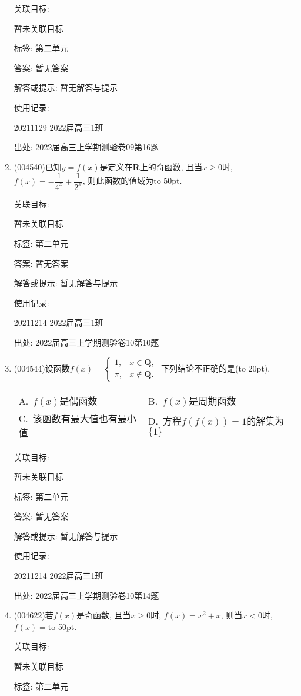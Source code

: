 \documentclass[10pt,a4paper]{article}
\newcommand{\blank}[1]{\underline{\hbox to #1pt{}}}
\newcommand{\bracket}[1]{(\hbox to #1pt{})}
\newcommand{\twoch}[4]{\par\begin{tabular}{p{.46\textwidth}p{.46\textwidth}}
A.~#1& B.~#2\\
C.~#3& D.~#4
\end{tabular}}
\begin{document}
\begin{enumerate}[1.]
关联目标:

暂未关联目标



标签: 第二单元

答案: 暂无答案

解答或提示: 暂无解答与提示

使用记录:

20211129	2022届高三1班	


出处: 2022届高三上学期测验卷09第16题
\item { (004540)}已知$y=f(x)$是定义在$\mathbf{R}$上的奇函数, 且当$x\ge 0$时, $f(x)=-\dfrac 1{4^x}+\dfrac 1{2^x}$, 则此函数的值域为\blank{50}.


关联目标:

暂未关联目标



标签: 第二单元

答案: 暂无答案

解答或提示: 暂无解答与提示

使用记录:

20211214	2022届高三1班	


出处: 2022届高三上学期测验卷10第10题
\item { (004544)}设函数$f(x)=\begin{cases}1, & x\in \mathbf{Q}, \\ \pi, &x\not\in \mathbf{Q}.\end{cases}$ 下列结论不正确的是\bracket{20}.
\twoch{$f(x)$是偶函数}{$f(x)$是周期函数}{该函数有最大值也有最小值}{方程$f(f(x))=1$的解集为$\{1\}$}


关联目标:

暂未关联目标



标签: 第二单元

答案: 暂无答案

解答或提示: 暂无解答与提示

使用记录:

20211214	2022届高三1班	


出处: 2022届高三上学期测验卷10第14题
\item { (004622)}若$f(x)$是奇函数, 且当$x\ge 0$时, $f(x)=x^2+x$, 则当$x<0$时, $f(x)=$\blank{50}.


关联目标:

暂未关联目标



标签: 第二单元


\end{enumerate}
\end{document}
